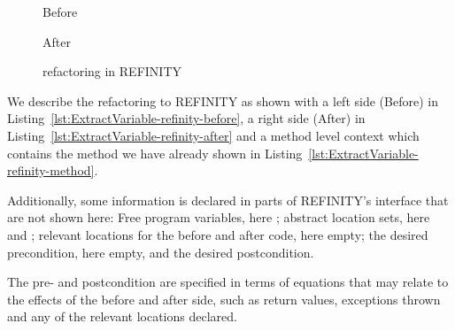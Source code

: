 \begin{figure}[tbp]
  \captionsetup{type=lstlisting}
  \centering
  \begin{sublstlisting}[b]{.34\linewidth}
    
    \vspace{-2mm}
    \caption{Before}
    \label{lst:ExtractVariable-refinity-before}
  \end{sublstlisting}\hspace{1cm}
  \begin{sublstlisting}[b]{.34\linewidth}
    
    \vspace{-2mm}
    \caption{After}
    \label{lst:ExtractVariable-refinity-after}
  \end{sublstlisting}
\caption{ refactoring in REFINITY}
\label{lst:ExtractVariable-refinity}
\end{figure}

We describe the refactoring to REFINITY as shown with a left side (Before) in Listing~\ref{lst:ExtractVariable-refinity-before},
a right side (After) in Listing~\ref{lst:ExtractVariable-refinity-after} and a method level context which contains the method we have already shown in Listing~\ref{lst:ExtractVariable-refinity-method}.

Additionally, some information is declared in parts of REFINITY's interface that are not shown here:
Free program variables, here ; abstract location sets, here  and ; relevant locations for the before and after code, here empty;
the desired precondition, here empty, and the desired postcondition.

The pre- and postcondition are specified in terms of equations that may relate to the effects of the before and after side, such as return values, exceptions thrown and any of the relevant locations declared.


